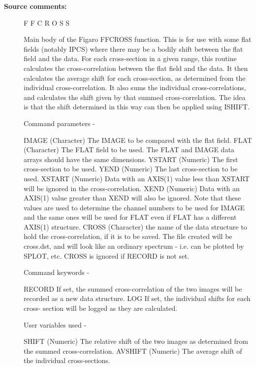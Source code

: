 \begin{description}
\begin{description}
\item [\textbf{Source comments:}]
\begin{terminalv}
 F F C R O S S

 Main body of the Figaro FFCROSS function.  This is for use
 with some flat fields (notably IPCS) where there may be a bodily
 shift between the flat field and the data.  For each
 cross-section in a given range, this routine calculates the
 cross-correlation between the flat field and the data.  It then
 calculates the average shift for each cross-section, as determined
 from the individual cross-correlation.  It also sums the individual
 cross-correlations, and calculates the shift given by that summed
 cross-correlation.  The idea is that the shift determined in this
 way can then be applied using ISHIFT.

 Command parameters -

 IMAGE       (Character) The IMAGE to be compared with
             the flat field.
 FLAT        (Character) The FLAT field to be used.
             The FLAT and IMAGE data arrays should have the same
             dimensions.
 YSTART      (Numeric) The first cross-section to be used.
 YEND        (Numeric) The last cross-section to be used.
 XSTART      (Numeric) Data with an AXIS(1) value less than XSTART
             will be ignored in the cross-correlation.
 XEND        (Numeric) Data with an AXIS(1) value greater than XEND
             will also be ignored.  Note that these values are
             used to determine the channel numbers to be used
             for IMAGE and the same ones will be used for
             FLAT even if FLAT has a  different AXIS(1)
             structure.
 CROSS       (Character) the name of the data structure to hold
             the cross-correlation, if it is to be saved.
             The file created will be cross.dst, and will look
             like an ordinary spectrum - i.e. can be plotted by
             SPLOT, etc.  CROSS is ignored if RECORD is not set.

 Command keywords -

 RECORD      If set, the summed cross-correlation of the two
             images will be recorded as a new data structure.
 LOG         If set, the individual shifts for each cross-
             section will be logged as they are calculated.

 User variables used -

 SHIFT       (Numeric) The relative shift of the two images as
             determined from the summed cross-correlation.
 AVSHIFT     (Numeric) The average shift of the individual
             cross-sections.


\end{terminalv}
\end{description}
\end{description}
